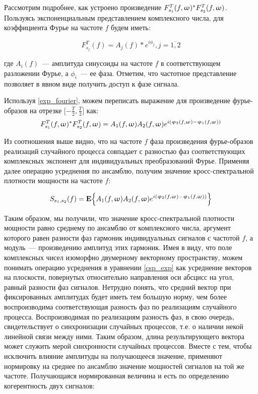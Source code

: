 Рассмотрим подробнее, как устроено произведение
$F_{s_1}^T(f,\upomega)^* F_{s_2}^T(f,\upomega)$.
Пользуясь экспоненциальным представлением комплексного числа, для коэффициента Фурье на частоте $f$
будем иметь:

\begin{equation}
    F_{s_j}^T(f) = A_j(f) * e^{i\phi_j}, j=\overline{1,2}
    \label{exp_fourier}
\end{equation}

где $A_i(f)$~--- амплитуда синусоиды на частоте $f$ в соответствующем
разложении Фурье, а $\phi_i$~--- ее фаза.  Отметим, что частотное представление
позволяет в явном виде получить доступ к фазе сигнала.

Используя \ref{exp_fourier}, можем переписать выражение для произведение фурье-образов
на отрезке $\Big[{-\frac{T}{2}}, \frac{T}{2}\Big]$ как:
\begin{equation}
    F_{s_1}^T(f,\upomega)^* F_{s_2}^T(f,\upomega) =
    A_1(f,\upomega)A_2(f,\upomega) e^{i(\upvarphi_2(f,\upomega) - \upvarphi_1(f,\upomega))}
\end{equation}

Из соотношения выше видно, что на частоте $f$ фаза произведения фурье-образов
реализаций случайного процесса совпадает с разностью фаз соответствующих
комплексных экспонент для индивидуальных преобразований Фурье. Применяя далее
операцию усреднения по ансамблю, получим значение кросс-спектральной плотности
мощности на частоте $f$:

\begin{equation}
    S_{s_1, s_2}(f) = \mathbf{E}\Big\{A_1(f,\upomega)A_2(f,\upomega) e^{i(\upvarphi_2(f,\upomega) - \upvarphi_1(f,\upomega))}\Big\}
    \label{csp_exp}
\end{equation}

Таким образом, мы получили, что значение кросс-спектральной плотности мощности
равно среднему по ансамблю от комплексного числа, аргумент которого равен
разности фаз гармоник индивидуальных сигналов с частотой $f$, а  модуль~---
произведению амплитуд этих гармоник.  Имея в виду, что поле комплексных чисел
изоморфно двумерному векторному пространству, можем понимать операцию
усреднения в уравнении \ref{csp_exp} как усреднение векторов на плоскости,
повернутых относительно направления оси абсцисс на угол, равный разности фаз
сигналов.  Нетрудно понять, что средний вектор при фиксированных амплитудах
будет иметь тем большую норму, чем более воспроизводима соответствующая
разность фаз по реализациям случайного процесса.  Воспроизводимая по
реализациям разность фаз, в свою очередь, свидетельствует о синхронизации
случайных процессов, т.е. о наличии некой линейной связи между ними.  Таким
образом, длина результирующего вектора может служить мерой синхронности
случайных процессов.  Вместе с тем, чтобы исключить влияние амплитуды на
получающееся значение, применяют нормировку на среднее по ансамблю значение
мощностей сигналов на той же частоте.  Получающаяся нормированная величина и
есть по определению когерентность двух сигналов:

